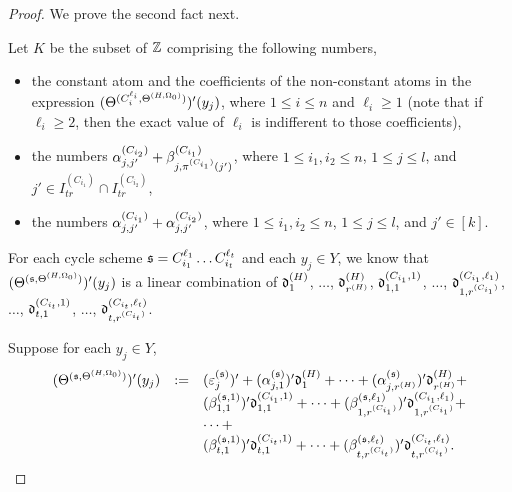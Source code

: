 \begin{appendix}
\begin{proof}
\medskip

We prove the second fact next. 

Let $K$ be the subset of ${\mathbb{Z} }$ comprising the following numbers,
\begin{itemize}
\item the constant atom and the coefficients of the non-constant atoms in the expression $(\Theta^{(C^{\ell_i}_{i}, \Theta^{(H,\Omega_0)})})'(y_j)$, where $1 \le i \le n$ and $\ell_i \ge 1$ (note that if $\ell_i \ge 2$, then the exact value of $\ell_i$ is indifferent to those coefficients),

%
\item  the numbers $\alpha^{(C_{i_2})}_{j,j'} + \beta^{(C_{i_1})}_{j,\pi^{(C_{i_1})}(j')}$, where $1 \le i_1,i_2 \le n$,  $1 \le j \le l$, and $j' \in I^{(C_{i_1})}_{tr} \cap I^{(C_{i_2})}_{tr}$,
%
\item  the numbers $\alpha^{(C_{i_1})}_{j, j'} + \alpha^{(C_{i_2})}_{j,j'}$, where $1 \le i_1,i_2 \le n$, $1 \le j \le l$, and $j' \in [k]$. 
\end{itemize}

For each cycle scheme ${\mathfrak{s} }=C^{\ell_1}_{i_1} \dots C^{\ell_t}_{i_t}$ and each $y_j \in Y$, we know that $(\Theta^{({\mathfrak{s} },\Theta^{(H,\Omega_0)})})'(y_j)$ is a linear combination of $\mathfrak{d}^{(H)}_1$, $\dots$, $\mathfrak{d}^{(H)}_{r^{(H)}}$, $\mathfrak{d}^{(C_{i_1},1)}_{1,1}$, $\dots$, $\mathfrak{d}^{(C_{i_1},\ell_1)}_{1,r^{(C_{i_1})}}$, $\dots$, $\mathfrak{d}^{(C_{i_t},1)}_{t,1}$, $\dots$, $\mathfrak{d}^{(C_{i_t},\ell_t)}_{t, r^{(C_{i_t})}}$. 


Suppose for each $y_j \in Y$,
\[
\begin{array}{l cl }
(\Theta^{({\mathfrak{s} },\Theta^{(H,\Omega_0)})})'(y_j) &:= & (\varepsilon^{({\mathfrak{s} })}_{j})'  + (\alpha^{({\mathfrak{s} })}_{j,1})' \mathfrak{d}^{(H)}_1 + \dots + (\alpha^{({\mathfrak{s} })}_{j,r^{(H)}})' \mathfrak{d}^{(H)}_{r^{(H)}} + \\
& & (\beta^{({\mathfrak{s} },1)}_{1,1})' \mathfrak{d}^{(C_{i_1},1)}_{1,1}  + \dots + (\beta^{({\mathfrak{s} },\ell_1)}_{1,r^{(C_{i_1})}})' \mathfrak{d}^{(C_{i_1},\ell_1)}_{1,r^{(C_{i_1})}}  +  \\
& & \dots + \\
& & (\beta^{({\mathfrak{s} },1)}_{t,1})' \mathfrak{d}^{(C_{i_{t}},1)}_{t,1} + \dots + (\beta^{({\mathfrak{s} },\ell_{t})}_{t,r^{(C_{i_{t}})}})' \mathfrak{d}^{(C_{i_{t}},\ell_{t})}_{t, r^{(C_{i_{t}})}}.
\end{array}
\]




\end{proof}
\end{appendix}

